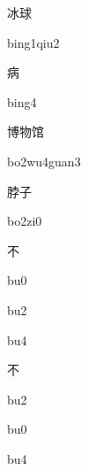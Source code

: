 \begin{multicols*}{2}
\begin{verbete}{冰球}
\begin{pronuncia}{bing1qiu2}
\end{pronuncia}
\end{verbete}

\begin{verbete}[bing4]{病}
\begin{pronuncia}{bing4}
\end{pronuncia}
\end{verbete}

\begin{verbete}[bo2wu4guan3]{博物馆}
\begin{pronuncia}{bo2wu4guan3}
\end{pronuncia}
\end{verbete}

\begin{verbete}[bo2zi0]{脖子}
\begin{pronuncia}{bo2zi0}
\end{pronuncia}
\end{verbete}

\begin{verbete}[bu0]{不}
\begin{pronuncia}{bu0}
\end{pronuncia}
\begin{pronuncia}{bu2}
\end{pronuncia}
\begin{pronuncia}{bu4}
\end{pronuncia}
\end{verbete}

\begin{verbete}[bu2]{不}
\begin{pronuncia}{bu2}
\end{pronuncia}
\begin{pronuncia}{bu0}
\end{pronuncia}
\begin{pronuncia}{bu4}
\end{pronuncia}
\end{verbete}


\end{multicols*}
